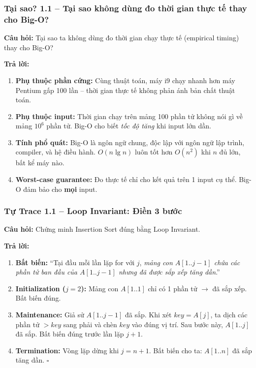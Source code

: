 \documentclass[10pt]{article}
\begin{document}
\subsubsection{Tại sao? 1.1 -- Tại sao không dùng đo thời gian thực tế thay cho Big-O?}\label{whyans:1.1}

\textbf{Câu hỏi:} Tại sao ta không dùng đo thời gian chạy thực tế (empirical timing) thay cho Big-O?

\textbf{Trả lời:}
\begin{enumerate}
\item \textbf{Phụ thuộc phần cứng:} Cùng thuật toán, máy i9 chạy nhanh hơn máy Pentium gấp 100 lần -- thời gian thực tế không phản ánh bản chất thuật toán.
\item \textbf{Phụ thuộc input:} Thời gian chạy trên mảng 100 phần tử không nói gì về mảng $10^6$ phần tử. Big-O cho biết \textit{tốc độ tăng} khi input lớn dần.
\item \textbf{Tính phổ quát:} Big-O là ngôn ngữ chung, độc lập với ngôn ngữ lập trình, compiler, và hệ điều hành. $O(n \lg n)$ luôn tốt hơn $O(n^2)$ khi $n$ đủ lớn, bất kể máy nào.
\item \textbf{Worst-case guarantee:} Đo thực tế chỉ cho kết quả trên 1 input cụ thể. Big-O đảm bảo cho \textbf{mọi} input.
\end{enumerate}

\subsubsection{Tự Trace 1.1 -- Loop Invariant: Điền 3 bước}\label{traceans:1.1}

\textbf{Câu hỏi:} Chứng minh Insertion Sort đúng bằng Loop Invariant.

\textbf{Trả lời:}
\begin{enumerate}
\item \textbf{Bất biến:} ``Tại đầu mỗi lần lặp for với $j$, \textit{mảng con $A[1..j-1]$ chứa các phần tử ban đầu của $A[1..j-1]$ nhưng đã được sắp xếp tăng dần}.''

\item \textbf{Initialization ($j=2$):} Mảng con $A[1..1]$ chỉ có 1 phần tử $\to$ đã sắp xếp. Bất biến đúng.

\item \textbf{Maintenance:} Giả sử $A[1..j-1]$ đã sắp. Khi xét $key = A[j]$, ta dịch các phần tử $> key$ sang phải và chèn $key$ vào đúng vị trí. Sau bước này, $A[1..j]$ đã sắp. Bất biến đúng trước lần lặp $j+1$.

\item \textbf{Termination:} Vòng lặp dừng khi $j = n+1$. Bất biến cho ta: $A[1..n]$ đã sắp tăng dần. $\square$
\end{enumerate}
\end{document}
